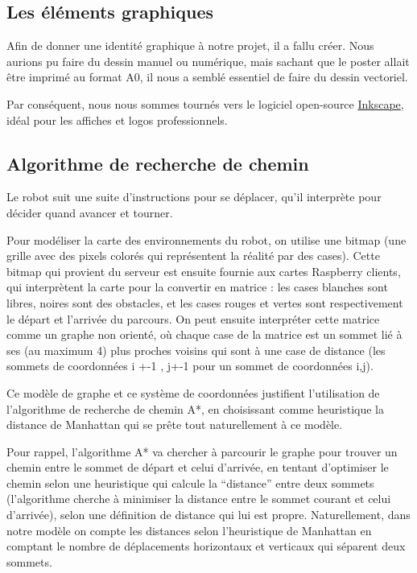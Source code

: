 \documentclass[a4paper,12pt]{report}  %
\begin{document}
\subsection{Les éléments graphiques}

Afin de donner une identité graphique à notre projet, il a fallu créer. Nous aurions pu faire du dessin manuel ou numérique, mais sachant que le poster allait être imprimé au format A0, il nous a semblé essentiel de faire du dessin vectoriel. 

Par conséquent, nous nous sommes tournés vers le logiciel open-source \href{https://inkscape.org/fr/}{Inkscape}, idéal pour les affiches et logos professionnels. 

\subsection{Algorithme de recherche de chemin}
Le robot suit une suite d’instructions pour se déplacer, qu’il interprète pour décider quand avancer et tourner.

Pour modéliser la carte des environnements du robot, on utilise une bitmap (une grille avec des pixels colorés qui représentent la réalité par des cases). Cette bitmap qui provient du serveur est ensuite fournie aux cartes Raspberry clients, qui interprètent la carte pour la convertir en matrice : les cases blanches sont libres, noires sont des obstacles, et les cases rouges et vertes sont respectivement le départ et l’arrivée du parcours. On peut ensuite interpréter cette matrice comme un graphe non orienté, où chaque case de la matrice est un sommet lié à ses (au maximum 4) plus proches voisins qui sont à une case de distance (les sommets de coordonnées i +-1 , j+-1 pour un sommet de coordonnées i,j).

Ce modèle de graphe et ce système de coordonnées justifient l’utilisation de l’algorithme de recherche de chemin A*, en choisissant comme heuristique la distance de Manhattan qui se prête tout naturellement à ce modèle.

Pour rappel, l’algorithme A* va chercher à parcourir le graphe pour trouver un chemin entre le sommet de départ et celui d’arrivée, en tentant d’optimiser le chemin selon une heuristique qui calcule la “distance” entre deux sommets (l’algorithme cherche à minimiser la distance entre le sommet courant et celui d’arrivée), selon une définition de distance qui lui est propre. Naturellement, dans notre modèle on compte les distances selon l’heuristique de Manhattan en comptant le nombre de déplacements horizontaux et verticaux qui séparent deux sommets.
\end{document}
